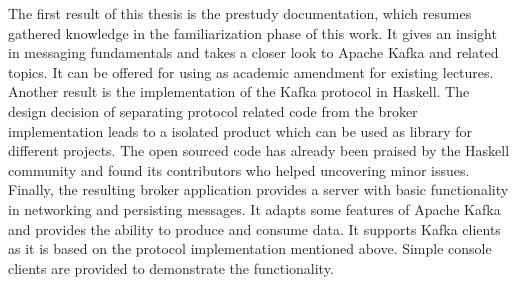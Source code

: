 The first result of this thesis is the prestudy documentation, which resumes
gathered knowledge in the familiarization phase of this work. It gives an
insight in messaging fundamentals and  takes a closer look to Apache Kafka and
related topics. It can be offered for using as academic amendment for existing
lectures. Another result is the implementation of the Kafka protocol in Haskell.
The design decision of separating protocol related code from the broker
implementation leads to a isolated product which can be used as library for
different projects. The open sourced code has already been praised by the
Haskell community and found its contributors who helped uncovering minor issues.
Finally, the resulting broker application provides a server with basic
functionality in networking and persisting messages. It adapts some features of
Apache Kafka and provides the ability to produce and consume data. It supports
Kafka clients as it is based on the protocol implementation mentioned above.
Simple console clients are provided to demonstrate the functionality.
